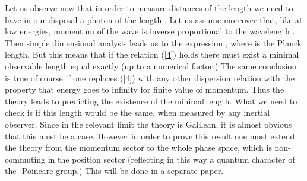 \documentclass [11pt] {article}
\begin{document}
Let us observe   now that in order to measure distances of the length 
\myHighlight{$\ell$}\coordHE{} we need to have in our disposal a photon of the length \myHighlight{$\lambda \sim 
\ell$}\coordHE{}.  Let us assume moreover that, like at low energies, momentum of the wave 
is inverse proportional to the wavelength \coordHE{}. Then simple 
dimensional analysis leads us to the  expression \coordHE{}, where \coordHE{} is the Planck  length. But this 
means that if the relation (\ref{4}) holds there must exist a minimal 
observable length equal exactly \coordHE{} (up to a numerical factor.) 
The same conclusion is true of course if one replaces (\ref{4}) with any 
other dispersion relation with the property that energy goes to infinity 
for finite value of momentum. Thus the theory leads to predicting the 
existence of the minimal length. What we need to check is if this length 
would be the same, when measured by any inertial observer. Since in the 
relevant limit the theory is Galilean, it is almost obvious that this must 
be a case. However in order to prove this result one must extend the theory 
from the momentum sector to the whole phase space, which is non-commuting 
in the position sector (reflecting in this way a quantum character of the 
\myHighlight{$\kappa$}\coordHE{}-Poincare group.) This will be done in a separate paper. 
\newline
\end{document}
